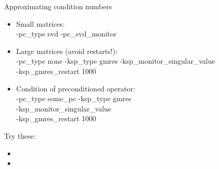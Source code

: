 \begin{frame}{Approximating condition numbers}

\begin{itemize}
\item Small matrices: \\
  {\kb -pc\_type svd -pc\_svd\_monitor}
\item Large matrices (avoid restarts!): \\
  {\kb -pc\_type none -ksp\_type gmres -ksp\_monitor\_singular\_value \bslash\\
    \qquad-ksp\_gmres\_restart 1000}
\item Condition of preconditioned operator: \\
  {\kb -pc\_type some\_pc -ksp\_type gmres \bslash \\
    \qquad -ksp\_monitor\_singular\_value \bslash \\
    \qquad -ksp\_gmres\_restart 1000}
\end{itemize}

Try these:

\begin{itemize}
\item {}
\item {}
\end{itemize}

\end{frame}
